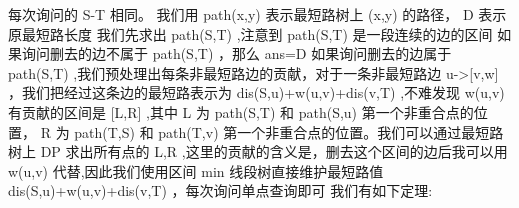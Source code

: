 {}每次询问的 \markdownRendererDollarSign{}S-T\markdownRendererDollarSign{} 相同。\markdownRendererParagraphSeparator
{}我们用\markdownRendererDollarSign{} path(x,y) \markdownRendererDollarSign{}表示最短路树上\markdownRendererDollarSign{} (x,y) \markdownRendererDollarSign{}的路径，\markdownRendererDollarSign{} D \markdownRendererDollarSign{}表示原最短路长度\markdownRendererParagraphSeparator
{}我们先求出\markdownRendererDollarSign{} path(S,T) \markdownRendererDollarSign{},注意到\markdownRendererDollarSign{} path(S,T) \markdownRendererDollarSign{}是一段连续的边的区间\markdownRendererParagraphSeparator
{}如果询问删去的边不属于\markdownRendererDollarSign{} path(S,T) \markdownRendererDollarSign{}，那么\markdownRendererDollarSign{} ans=D \markdownRendererDollarSign{}\markdownRendererParagraphSeparator
{}如果询问删去的边属于\markdownRendererDollarSign{} path(S,T) \markdownRendererDollarSign{},我们预处理出每条非最短路边的贡献，对于一条非最短路边\markdownRendererDollarSign{} u->[v,w] \markdownRendererDollarSign{}，我们把经过这条边的最短路表示为\markdownRendererDollarSign{} dis(S,u)+w(u,v)+dis(v,T) \markdownRendererDollarSign{},不难发现\markdownRendererDollarSign{} w(u,v) \markdownRendererDollarSign{}有贡献的区间是\markdownRendererDollarSign{} [L,R] \markdownRendererDollarSign{},其中\markdownRendererDollarSign{} L \markdownRendererDollarSign{}为\markdownRendererDollarSign{} path(S,T) \markdownRendererDollarSign{}和\markdownRendererDollarSign{} path(S,u) \markdownRendererDollarSign{}第一个非重合点的位置，\markdownRendererDollarSign{} R \markdownRendererDollarSign{}为\markdownRendererDollarSign{} path(T,S) \markdownRendererDollarSign{}和\markdownRendererDollarSign{} path(T,v) \markdownRendererDollarSign{}第一个非重合点的位置。我们可以通过最短路树上\markdownRendererDollarSign{} DP \markdownRendererDollarSign{}求出所有点的\markdownRendererDollarSign{} L,R \markdownRendererDollarSign{},这里的贡献的含义是，删去这个区间的边后我可以用\markdownRendererDollarSign{} w(u,v) \markdownRendererDollarSign{}代替,因此我们使用区间\markdownRendererDollarSign{} min \markdownRendererDollarSign{}线段树直接维护最短路值\markdownRendererDollarSign{} dis(S,u)+w(u,v)+dis(v,T) \markdownRendererDollarSign{}，每次询问单点查询即可\markdownRendererInterblockSeparator
{}\markdownRendererInterblockSeparator
{}
\markdownRendererSectionEnd \markdownRendererSectionBegin
{}\markdownRendererInterblockSeparator
{}我们有如下定理:\markdownRendererParagraphSeparator
